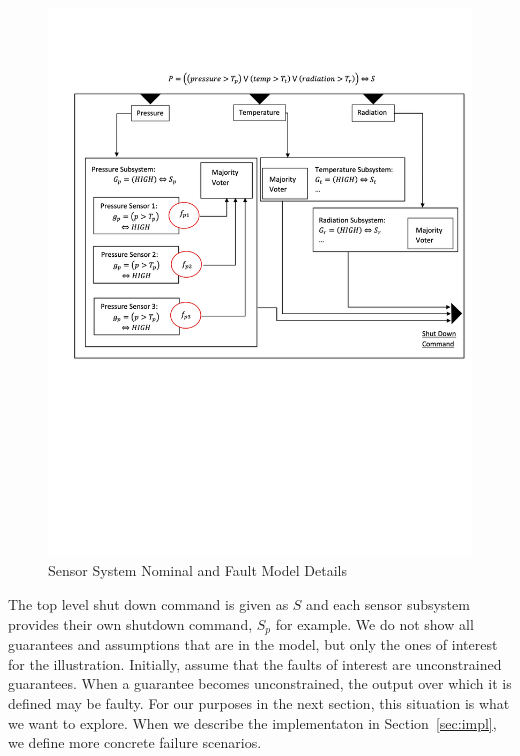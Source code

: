 \begin{figure}[h!]
	\begin{center}
		\includegraphics[width=1.0\textwidth, trim={0 7.5cm 0 0},clip]{images/PWRFigureContracts.png}
	\end{center}
	\vspace{-6em}
	\caption{Sensor System Nominal and Fault Model Details}
	\label{fig:sensorSysContracts}
\end{figure}

The top level shut down command is given as $S$ and each sensor subsystem provides their own shutdown command, $S_p$ for example.  We do not show all guarantees and assumptions that are in the model, but only the ones of interest for the illustration. Initially, assume that the faults of interest are unconstrained guarantees. When a guarantee becomes unconstrained, the output over which it is defined may be faulty. For our purposes in the next section, this situation is what we want to explore. When we describe the implementaton in Section~\ref{sec:impl}, we define more concrete failure scenarios.

